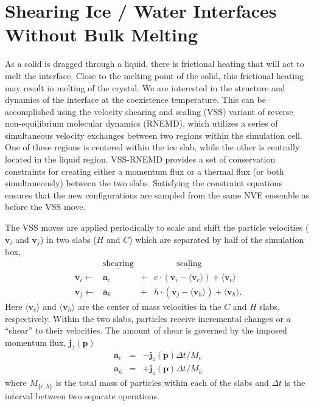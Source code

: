 \section{Shearing Ice / Water Interfaces Without Bulk Melting}

As a solid is dragged through a liquid, there is frictional heating
that will act to melt the interface.  Close to the melting point of the
solid, this frictional heating may result in melting of the crystal.
We are interested in the structure and dynamics of the interface at
the coexistence temperature.  This can be accomplished using the velocity
shearing and scaling (VSS) variant of reverse non-equilibrium
molecular dynamics (RNEMD), which utilizes a series of simultaneous
velocity exchanges between two regions within the simulation
cell.\cite{Kuang2012} One of these regions is centered within the ice
slab, while the other is centrally located in the liquid
region. VSS-RNEMD provides a set of conservation constraints for
creating either a momentum flux or a thermal flux (or both
simultaneously) between the two slabs.  Satisfying the constraint
equations ensures that the new configurations are sampled from the
same NVE ensemble as before the VSS move.

The VSS moves are applied periodically to scale and shift the particle
velocities ($\mathbf{v}_i$ and $\mathbf{v}_j$) in two slabs ($H$ and
$C$) which are separated by half of the simulation box,
\begin{displaymath}
\begin{array}{rclcl}

 & \underline{\mathrm{shearing}} & &
 \underline{~~~~~~~~~~~~\mathrm{scaling}~~~~~~~~~~~~} \\
\mathbf{v}_i \leftarrow & 
  \mathbf{a}_c\ & + & c\cdot\left(\mathbf{v}_i - \langle\mathbf{v}_c
  \rangle\right)  +  \langle\mathbf{v}_c\rangle \\
\mathbf{v}_j \leftarrow & 
  \mathbf{a}_h & + & h\cdot\left(\mathbf{v}_j - \langle\mathbf{v}_h
    \rangle\right) + \langle\mathbf{v}_h\rangle .

\end{array}
\end{displaymath}
Here $\langle\mathbf{v}_c\rangle$ and $\langle\mathbf{v}_h\rangle$ are
the center of mass velocities in the $C$ and $H$ slabs, respectively.
Within the two slabs, particles receive incremental changes or a
``shear'' to their velocities.  The amount of shear is governed by the
imposed momentum flux, $\mathbf{j}_z(\mathbf{p})$
\begin{eqnarray}
\mathbf{a}_c & = & - \mathbf{j}_z(\mathbf{p}) \Delta t / M_c \label{vss1}\\
\mathbf{a}_h & = & + \mathbf{j}_z(\mathbf{p}) \Delta t / M_h \label{vss2}
\end{eqnarray}
where $M_{\{c,h\}}$ is the total mass of particles within each of the
slabs and $\Delta t$ is the interval between two separate operations.

